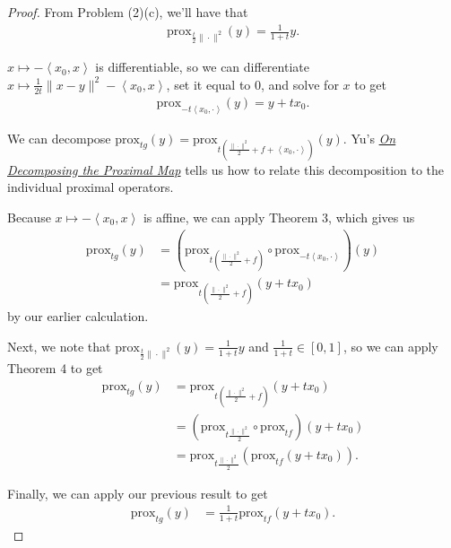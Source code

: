 \documentclass[11pt]{amsart}
\newcommand{\prox}{\mathrm{prox}}
\begin{document}
\begin{enumerate}
\begin{enumerate}
\begin{proof}
    From Problem (2)(c), we'll have that
    \begin{align*}
      \prox_{\frac{t}{2}\| \cdot \|^2}(y) = \frac{1}{1 + t}y.
    \end{align*}

    $x \mapsto -\left\langle x_0, x \right\rangle$ is differentiable, so we can
    differentiate
    $x \mapsto \frac{1}{2t}\|x-y\|^2 -\left\langle x_0, x \right\rangle$, set it
    equal to $0$, and solve for $x$ to get
    \begin{align*}
      \prox_{-t\left\langle x_0, \cdot \right\rangle}(y) = y + tx_0.      
    \end{align*}

    We can decompose
    $\prox_{t g}(y) = \prox_{t \left(\frac{\| \cdot \|^2}{2} + f + \left\langle
          x_0, \cdot \right\rangle\right)}(y)$. Yu's
    \href{http://papers.neurips.cc/paper/4863-on-decomposing-the-proximal-map}{\emph{On
        Decomposing the Proximal Map}} tells us how to relate this decomposition
    to the individual proximal operators.

    Because $x \mapsto -\left\langle x_0, x \right\rangle$ is affine, we can
    apply Theorem 3, which gives us
    \begin{align*}
      \prox_{t g}(y)
      &= \left(\prox_{t \left(\frac{\| \cdot \|^2}{2} + f\right)} \circ
        \prox_{-t\left\langle x_0, \cdot \right\rangle}\right)(y) \\
      &= \prox_{t \left(\frac{\| \cdot \|^2}{2} + f\right)}\left(y + tx_0\right)
    \end{align*}
    by our earlier calculation.

    Next, we note that $\prox_{\frac{t}{2}\| \cdot \|^2}(y) = \frac{1}{1 + t}y$
    and $\frac{1}{1 + t} \in [0, 1]$, so we can apply Theorem 4 to get
    \begin{align*}
      \prox_{t g}(y)
      &= \prox_{t \left(\frac{\| \cdot \|^2}{2} + f\right)}\left(y + tx_0\right) \\
      &= \left(\prox_{t\frac{\| \cdot \|^2}{2}} \circ \prox_{tf}\right)\left(y + tx_0\right) \\
      &= \prox_{t\frac{\| \cdot \|^2}{2}} \left( \prox_{tf}\left(y + tx_0\right)\right).      
    \end{align*}

    Finally, we can apply our previous result to get
    \begin{align*}
      \prox_{t g}(y)
      &= \frac{1}{1 + t}\prox_{tf}\left(y + tx_0\right).
    \end{align*}
  \end{proof}
  

\end{enumerate}
\end{enumerate}
\end{document}
